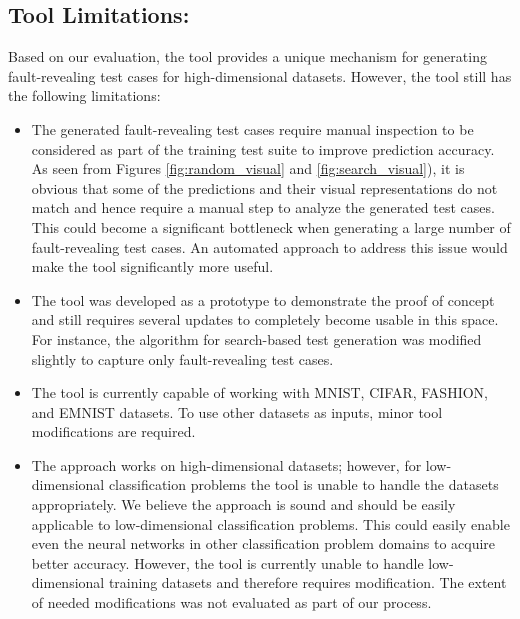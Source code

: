 \subsection{Tool Limitations:} Based on our evaluation, the tool provides a unique mechanism for generating fault-revealing test cases for high-dimensional datasets. However, the tool still has the following limitations:
\begin{itemize}
	\item The generated fault-revealing test cases require manual inspection to be considered as part of the training test suite to improve prediction accuracy. As seen from Figures \ref{fig:random_visual} and \ref{fig:search_visual}), it is obvious that some of the predictions and their visual representations do not match and hence require a manual step to analyze the generated test cases. This could become a significant bottleneck when generating a large number of fault-revealing test cases. An automated approach to address this issue would make the tool significantly more useful. 
	\item The tool was developed as a prototype to demonstrate the proof of concept and still requires several updates to completely become usable in this space. For instance, the algorithm for search-based test generation was modified slightly to capture only fault-revealing test cases. 
	\item The tool is currently capable of working with MNIST, CIFAR, FASHION, and EMNIST datasets. To use other datasets as inputs, minor tool modifications are required.
	\item The approach works on high-dimensional datasets; however, for low-dimensional classification problems the tool is unable to handle the datasets appropriately. We believe the approach is sound and should be easily applicable to low-dimensional classification problems. This could easily enable even the neural networks in other classification problem domains to acquire better accuracy. However, the tool is currently unable to handle low-dimensional training datasets and therefore requires modification. The extent of needed modifications was not evaluated as part of our process.
\end{itemize}
